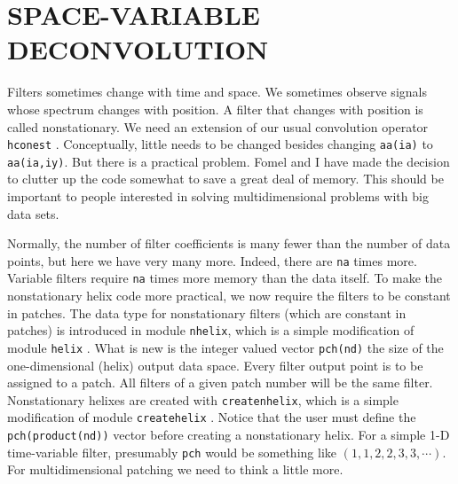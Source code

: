 \section{SPACE-VARIABLE DECONVOLUTION}
Filters sometimes change with time and space.
We sometimes observe signals whose spectrum changes with position.
A filter that changes with position is called nonstationary.
We need an extension of our usual convolution operator
\texttt{hconest} .
Conceptually,
little needs to be changed besides changing 
\texttt{aa(ia)} to
\texttt{aa(ia,iy)}.
But there is a practical problem.
Fomel and I have made the decision
to clutter up the code somewhat
to save a great deal of memory.
This should be important to people interested in
solving multidimensional problems with big data sets.
\par
Normally, the number of filter coefficients is many fewer
than the number of data points,
but here we have very many more.
Indeed, there are {\tt na} times more.
Variable filters require {\tt na} times more memory than the data itself.
To make the nonstationary helix code more practical,
we now require the filters to be constant in patches.
The data type for nonstationary filters
(which are constant in patches)
is introduced in module
	\texttt{nhelix}, which is a simple modification of module
	\texttt{helix} .
What is new is the integer valued vector \texttt{pch(nd)}
the size of the one-dimensional (helix) output data space.
Every filter output point is to be assigned to a patch.
All filters of a given patch number will be the same filter.
Nonstationary helixes are created with
	\texttt{createnhelix}, which is a simple modification of module
	\texttt{createhelix} .
Notice that the user must define the \texttt{pch(product(nd))}
vector before creating a nonstationary helix.
For a simple 1-D time-variable filter,
presumably \texttt{pch} would be something like
$(1,1,2,2,3,3,\cdots)$.
For multidimensional patching we need to think a little more.


